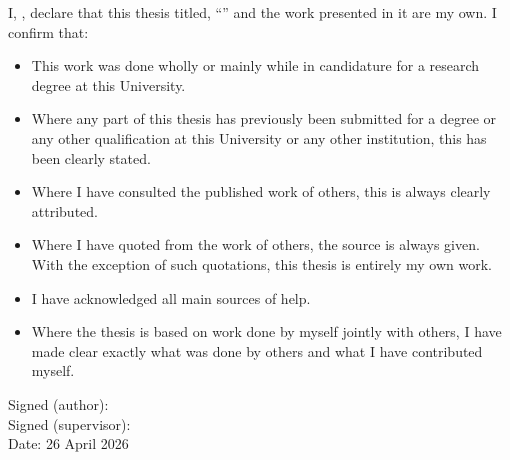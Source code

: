 \documentclass[
11pt, %
oneside, %
ukrainian,
english, %
singlespacing, %
headsepline, %
]{Thesis} %
\begin{document}

\begin{declaration}
\addchaptertocentry{\authorshipname} %
\noindent I, \authorname, declare that this thesis titled, \enquote{\ttitle} and the work presented in it are my own. I confirm that:

\begin{itemize} 
\item This work was done wholly or mainly while in candidature for a research degree at this University.
\item Where any part of this thesis has previously been submitted for a degree or any other qualification at this University or any other institution, this has been clearly stated.
\item Where I have consulted the published work of others, this is always clearly attributed.
\item Where I have quoted from the work of others, the source is always given. With the exception of such quotations, this thesis is entirely my own work.
\item I have acknowledged all main sources of help.
\item Where the thesis is based on work done by myself jointly with others, I have made clear exactly what was done by others and what I have contributed myself.\\
\end{itemize}

\vspace{15em}
\noindent Signed (author): \underline{\hspace{6cm}} \authorname \\
 
\noindent Signed (supervisor): \underline{\hspace{5.4cm}} \supname \\
 
\noindent Date: 26 April 2026

\end{declaration}

\cleardoublepage

\end{document}
